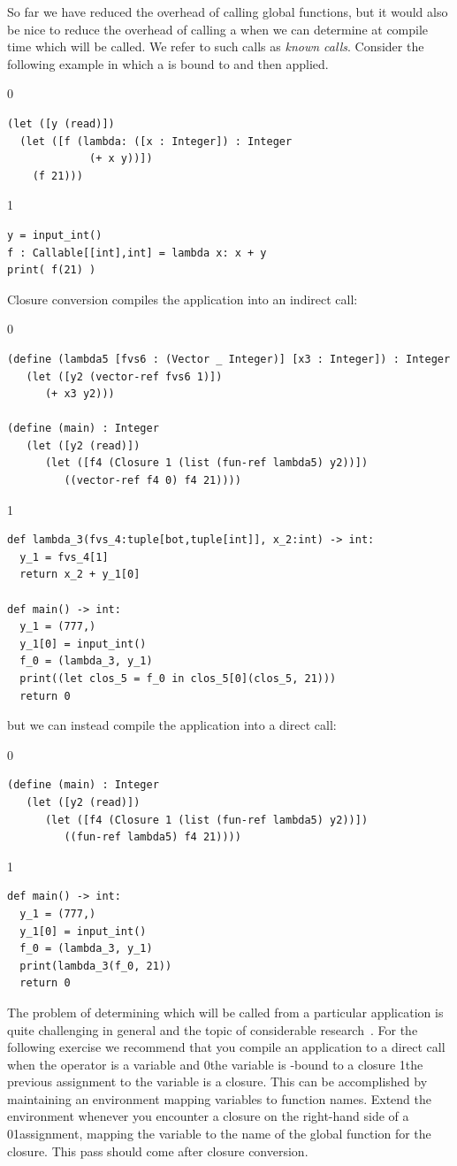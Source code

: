 \documentclass[7x10,nocrop]{TimesAPriori_MIT}%
\def\racketEd{0}
\def\pythonEd{1}
\def\edition{1}
\newcommand{\racket}[1]{{\if\edition\racketEd{#1}\fi}}
\newcommand{\python}[1]{{\if\edition\pythonEd #1\fi}}
\begin{document}
So far we have reduced the overhead of calling global functions, but
it would also be nice to reduce the overhead of calling a
 when we can determine at compile time which
 will be called. We refer to such calls as \emph{known
  calls}.  Consider the following example in which a  is
bound to  and then applied.
{\if\edition\racketEd
\begin{lstlisting}
(let ([y (read)])
  (let ([f (lambda: ([x : Integer]) : Integer
             (+ x y))])
    (f 21)))
\end{lstlisting}
\fi}
{\if\edition\pythonEd
\begin{lstlisting}
y = input_int()
f : Callable[[int],int] = lambda x: x + y
print( f(21) )
\end{lstlisting}
\fi}
%
\noindent Closure conversion compiles the application
 into an indirect call:
%
{\if\edition\racketEd
\begin{lstlisting}
(define (lambda5 [fvs6 : (Vector _ Integer)] [x3 : Integer]) : Integer
   (let ([y2 (vector-ref fvs6 1)])
      (+ x3 y2)))

(define (main) : Integer
   (let ([y2 (read)])
      (let ([f4 (Closure 1 (list (fun-ref lambda5) y2))])
         ((vector-ref f4 0) f4 21))))
\end{lstlisting}
\fi}
{\if\edition\pythonEd
\begin{lstlisting}
def lambda_3(fvs_4:tuple[bot,tuple[int]], x_2:int) -> int:
  y_1 = fvs_4[1]
  return x_2 + y_1[0]

def main() -> int:
  y_1 = (777,)
  y_1[0] = input_int()
  f_0 = (lambda_3, y_1)
  print((let clos_5 = f_0 in clos_5[0](clos_5, 21)))
  return 0
\end{lstlisting}
\fi}
%
\noindent but we can instead compile the application
 into a direct call:
%
{\if\edition\racketEd
\begin{lstlisting}
(define (main) : Integer
   (let ([y2 (read)])
      (let ([f4 (Closure 1 (list (fun-ref lambda5) y2))])
         ((fun-ref lambda5) f4 21))))
\end{lstlisting}
\fi}
{\if\edition\pythonEd
\begin{lstlisting}
def main() -> int:
  y_1 = (777,)
  y_1[0] = input_int()
  f_0 = (lambda_3, y_1)
  print(lambda_3(f_0, 21))
  return 0
\end{lstlisting}
\fi}

The problem of determining which  will be called from a
particular application is quite challenging in general and the topic
of considerable research~\citep{Shivers:1988aa,Gilray:2016aa}. For the
following exercise we recommend that you compile an application to a
direct call when the operator is a variable and \racket{the variable
  is -bound to a closure} \python{the previous assignment to
  the variable is a closure}.  This can be accomplished by maintaining
an environment mapping variables to function names.  Extend the
environment whenever you encounter a closure on the right-hand side of
a \racket{}\python{assignment}, mapping the variable to the
name of the global function for the closure. This pass should come
after closure conversion.
\end{document}
